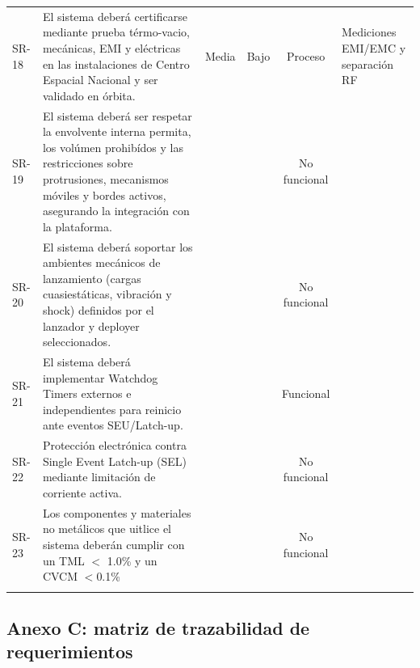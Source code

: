 \begin{footnotesize}
\begin{longtable}{@{}l >{\raggedright\arraybackslash}p{5.4cm} c c c >{\raggedright\arraybackslash}p{4.6cm}@{}}
SR-18 & El sistema deberá certificarse mediante prueba térmo-vacio, mecánicas, EMI y eléctricas en las instalaciones de Centro Espacial Nacional y ser validado en órbita. & Media & Bajo & Proceso & Mediciones EMI/EMC y separación RF \\
\addlinespace[2pt]
SR-19 & El sistema deberá ser respetar la envolvente interna permita, los volúmen prohibídos y las restricciones sobre protrusiones, mecanismos móviles y bordes activos, asegurando la integración con la plataforma. &  &  & No funcional &  \\
\addlinespace[2pt]
SR-20 & El sistema deberá soportar los ambientes mecánicos de lanzamiento (cargas cuasiestáticas, vibración y shock) definidos por el lanzador y deployer seleccionados. &  &  & No funcional &  \\
\addlinespace[2pt]
SR-21 & El sistema deberá implementar Watchdog Timers externos e independientes para reinicio ante eventos SEU/Latch-up. &  &  & Funcional &  \\
\addlinespace[2pt]
SR-22 & Protección electrónica contra Single Event Latch-up (SEL) mediante limitación de corriente activa. &  &  & No funcional &  \\
\addlinespace[2pt]
SR-23 & Los componentes y materiales no metálicos que uitlice el sistema deberán cumplir con un TML $<$ 1.0\% y un CVCM $<$0.1\% &  &  & No funcional &  \\
\addlinespace[2pt]
\end{longtable}
\end{footnotesize}

\subsection{Anexo C: matriz de trazabilidad de requerimientos}

